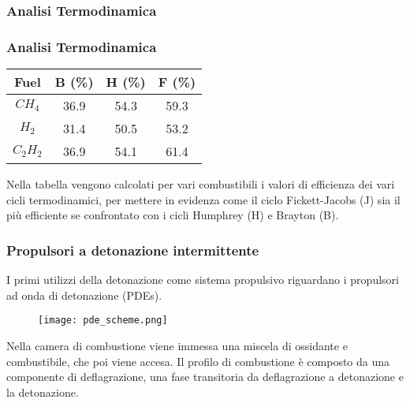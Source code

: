 \begin{frame}
  \frametitle{Analisi Termodinamica}
\end{frame}
\begin{frame}
  \frametitle{Analisi Termodinamica}
  \begin{table}[h!]
       \begin{tabular}{|c | c | c | c | }
    	 \hline
    	 \textbf{Fuel} & \textbf{B (\%)} & \textbf{H (\%)} & \textbf{F (\%)}\\ 
    	 \hline\hline
    	 $ CH_4 $ &36.9 & 54.3& 59.3 \\ \hline
    	 $ H_2 $ &31.4 &50.5 & 53.2 \\ \hline
    	 $ C_2 H_2 $ &36.9 &54.1 &61.4 \\\hline
    \end{tabular}
  \end{table}
Nella tabella vengono calcolati per vari combustibili i valori di efficienza dei vari cicli termodinamici, per mettere in evidenza come il ciclo Fickett-Jacobs (J) sia il più efficiente se confrontato con i cicli Humphrey (H) e Brayton (B).
\end{frame}
\begin{frame}
  \frametitle{Propulsori a detonazione intermittente}
  I primi utilizzi della detonazione come sistema propulsivo riguardano i propulsori ad onda di detonazione (PDEs). 
    \begin{figure}[H]
      \centering
      \texttt{[image: pde\_scheme.png]}
    \end{figure} 
    Nella camera di combustione viene immessa una miscela di ossidante e combustibile, che poi viene accesa. Il profilo di combustione è composto da una componente di deflagrazione, una fase transitoria da deflagrazione a detonazione e la detonazione.
\end{frame}
